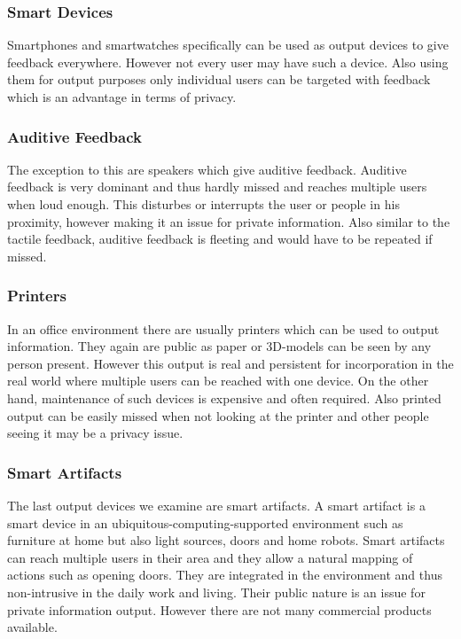 \documentclass{acm_proc_article-sp}
\begin{document}
\subsubsection{Smart Devices}
Smartphones and smartwatches specifically can be used as output devices to give feedback everywhere.
However not every user may have such a device.
Also using them for output purposes only individual users can be targeted with feedback which is an advantage in terms of privacy.

\subsubsection{Auditive Feedback}
The exception to this are speakers which give auditive feedback.
Auditive feedback is very dominant and thus hardly missed and reaches multiple users when loud enough.
This disturbes or interrupts the user or people in his proximity, however making it an issue for private information.
Also similar to the tactile feedback, auditive feedback is fleeting and would have to be repeated if missed.

\subsubsection{Printers}
In an office environment there are usually printers which can be used to output information.
They again are public as paper or 3D-models can be seen by any person present.
However this output is real and persistent for incorporation in the real world where multiple users can be reached with one device.
On the other hand, maintenance of such devices is expensive and often required.
Also printed output can be easily missed when not looking at the printer and other people seeing it may be a privacy issue.

\subsubsection{Smart Artifacts}
The last output devices we examine are smart artifacts.
A smart artifact is a smart device in an ubiquitous-computing-supported environment such as furniture at home but also light sources, doors and home robots.
Smart artifacts can reach multiple users in their area and they allow a natural mapping of actions such as opening doors.
They are integrated in the environment and thus non-intrusive in the daily work and living.
Their public nature is an issue for private information output.
However there are not many commercial products available.
\end{document}
